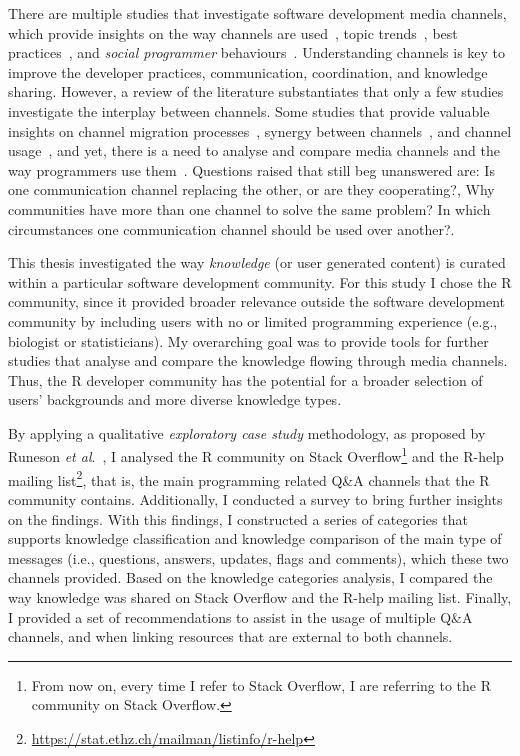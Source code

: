 \documentclass{sig-alternate-05-2015}
\begin{document}
	There are multiple studies that investigate software development media channels, which provide insights on the way channels are used~\cite{Guzzi2013, Storey2014, Singer2014},  topic trends~\cite{Barua2012, Kavaler2013, Wang2013d}, best practices~\cite{Asaduzzaman2013, Treude2011, Allamanis2013}, and \textit{social programmer} behaviours~\cite{Lang2013}.
	Understanding channels is key to improve the developer practices, communication, coordination, and knowledge sharing.
	However, a review of the literature substantiates that only a few studies investigate the interplay between channels.
	Some studies that provide valuable insights on channel migration processes~\cite{Vasilescu2014c}, synergy between channels~\cite{Vasilescu2013a, Bird2006, Kavaler2013}, and channel usage~\cite{Stolee2010,Storey2014}, and yet, there is a need to analyse and compare media channels and the way programmers use them~\cite{Vasilescu2014b}.
	Questions raised that still beg unanswered are: Is one communication channel replacing the other, or are they cooperating?, Why communities have more than one channel to solve the same problem? In which circumstances one communication channel should be used over another?.

	This thesis investigated the way \textit{knowledge} (or user generated content) is curated within a particular software development community.
	For this study I chose the R community, since it provided broader relevance outside the software development community by including users with no or limited programming experience (e.g., biologist or statisticians).
	My overarching goal was to provide tools for further studies that analyse and compare the knowledge flowing through media channels.
	Thus, the R developer community has the potential for a broader selection of users' backgrounds and more diverse knowledge types. 

	By applying a qualitative \textit{exploratory case study} methodology, as proposed by Runeson \textit{et al}.~\cite{Runeson2012}, I analysed the R community on Stack Overflow\footnote{From now on, every time I refer to Stack Overflow, I are referring to the R community on Stack Overflow.} and the R-help mailing list\footnote{\url{https://stat.ethz.ch/mailman/listinfo/r-help}}, that is, the main programming related Q\&A channels that the R community contains.
	Additionally, I conducted a survey to bring further insights on the findings.
	With this findings, I constructed a series of categories that supports knowledge classification and knowledge comparison of the main type of messages (i.e., questions, answers, updates, flags and comments), which these two channels provided.
	Based on the knowledge categories analysis, I compared the way knowledge was shared on Stack Overflow and the R-help mailing list.
	Finally, I provided a set of recommendations to assist in the usage of multiple Q\&A channels, and when linking resources that are external to both channels.
\end{document}

